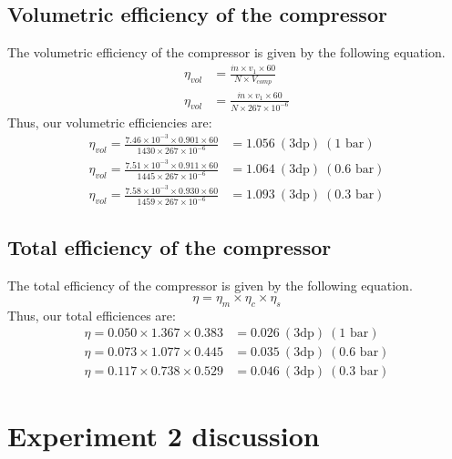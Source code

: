 \documentclass[class=article, crop=false, 12pt,a4paper]{standalone}
\numberwithin{equation}{section}
\begin{document}
\subsection{Volumetric efficiency of the compressor}
The volumetric efficiency of the compressor is given by the following equation.
\begin{align}
  \eta_{vol} &= \frac{\dot{m}\times v_1 \times 60}{N \times V_{comp}}\\
  \eta_{vol} &= \frac{\dot{m}\times v_1 \times 60}{N \times 267 \times 10^{-6}}
\end{align}
Thus, our volumetric efficiencies are:
\begin{align}
  \eta_{vol} = \frac{7.46\times 10^{-3} \times 0.901 \times 60}{1430 \times 267 \times 10^{-6}} &= 1.056 \ (3\textrm{dp}) \ (1 \textrm{ bar})\\
  \eta_{vol} = \frac{7.51\times 10^{-3}\times 0.911 \times 60}{1445 \times 267 \times 10^{-6}} &= 1.064 \ (3\textrm{dp}) \ (0.6 \textrm{ bar})\\
  \eta_{vol} = \frac{7.58\times 10^{-3}\times 0.930 \times 60}{1459 \times 267 \times 10^{-6}} &= 1.093 \ (3\textrm{dp}) \ (0.3 \textrm{ bar})
\end{align}
\subsection{Total efficiency of the compressor}
The total efficiency of the compressor is given by the following equation.
\begin{equation}
  \eta = \eta_m \times \eta_c \times \eta_s
\end{equation}
Thus, our total efficiences are:
\begin{align}
  \eta = 0.050\times 1.367\times 0.383 &= 0.026 \ (3\textrm{dp}) \ (1 \textrm{ bar})\\
  \eta = 0.073\times 1.077 \times 0.445 &= 0.035 \ (3\textrm{dp}) \ (0.6 \textrm{ bar})\\
  \eta = 0.117\times 0.738 \times 0.529 &= 0.046 \ (3\textrm{dp}) \ (0.3 \textrm{ bar})  
\end{align}
\section{Experiment 2 discussion}
\end{document}
